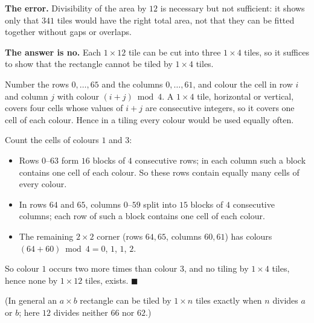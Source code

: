 \textbf{The error.} Divisibility of the area by $12$ is necessary but not sufficient: it shows only that $341$ tiles would have the right total area, not that they can be fitted together without gaps or overlaps.

\textbf{The answer is no.} Each $1\times12$ tile can be cut into three $1\times4$ tiles, so it suffices to show that the rectangle cannot be tiled by $1\times4$ tiles.

Number the rows $0,\dots,65$ and the columns $0,\dots,61$, and colour the cell in row $i$ and column $j$ with colour $(i+j)\bmod 4$. A $1\times4$ tile, horizontal or vertical, covers four cells whose values of $i+j$ are consecutive integers, so it covers one cell of each colour. Hence in a tiling every colour would be used equally often.

Count the cells of colours $1$ and $3$:
\begin{itemize}
\item Rows $0$--$63$ form $16$ blocks of $4$ consecutive rows; in each column such a block contains one cell of each colour. So these rows contain equally many cells of every colour.
\item In rows $64$ and $65$, columns $0$--$59$ split into $15$ blocks of $4$ consecutive columns; each row of such a block contains one cell of each colour.
\item The remaining $2\times2$ corner (rows $64,65$, columns $60,61$) has colours $(64+60)\bmod4=0$, $1$, $1$, $2$.
\end{itemize}
So colour $1$ occurs two more times than colour $3$, and no tiling by $1\times4$ tiles, hence none by $1\times12$ tiles, exists. $\blacksquare$

(In general an $a\times b$ rectangle can be tiled by $1\times n$ tiles exactly when $n$ divides $a$ or $b$; here $12$ divides neither $66$ nor $62$.)

